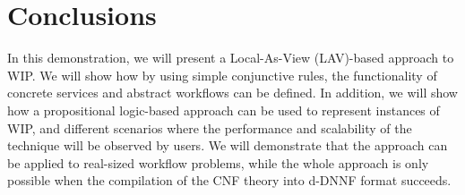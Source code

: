 \documentclass{llncs}
\begin{document}
\section{Conclusions}
In this demonstration, we will present a Local-As-View (LAV)-based approach \cite{levy:bucket} to WIP. We will show how by using simple conjunctive rules, the functionality of concrete services and abstract workflows can be defined. In addition, we will show how a propositional logic-based approach can be used to represent instances of WIP, and different scenarios where the performance and scalability of the technique will be observed by  users.  We will demonstrate that the approach can be applied to
real-sized workflow problems, while the whole approach is only possible
when the compilation of the CNF theory into d-DNNF format succeeds.


 
\end{document}
